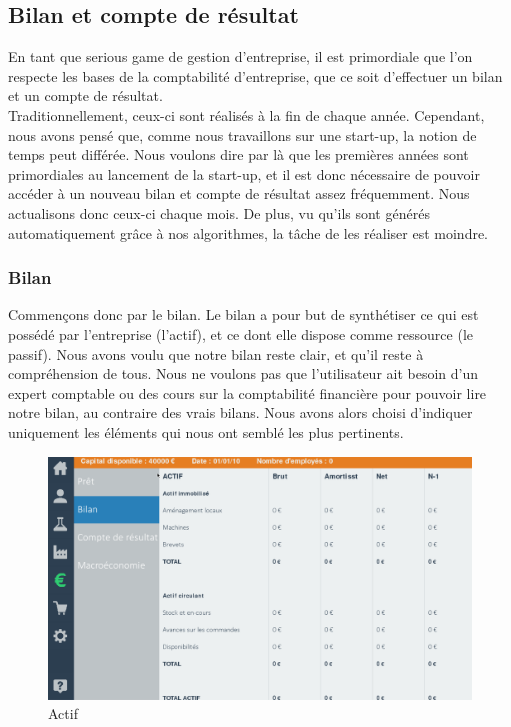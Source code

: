 \subsection{Bilan et compte de résultat}



En tant que serious game de gestion d’entreprise, il est primordiale que l'on respecte les bases de la comptabilité d’entreprise, que ce soit d’effectuer un bilan et un compte de résultat. \\
Traditionnellement, ceux-ci sont réalisés à la fin de chaque année. Cependant, nous avons pensé que, comme nous travaillons sur une start-up, la notion de temps peut différée. Nous voulons dire par là que les premières années sont primordiales au lancement de la start-up, et il est donc nécessaire de pouvoir accéder à un nouveau bilan et compte de résultat assez fréquemment. Nous actualisons donc ceux-ci chaque mois. De plus, vu qu’ils sont générés automatiquement grâce à nos algorithmes, la tâche de les réaliser est moindre.



\subsubsection{Bilan}



Commençons donc par le bilan. Le bilan a pour but de synthétiser ce qui est possédé par l’entreprise (l'actif), et ce dont elle dispose comme ressource (le passif).
Nous avons voulu que notre bilan reste clair, et qu’il reste à compréhension de tous. Nous ne voulons pas que l’utilisateur ait besoin d’un expert comptable ou des cours sur la comptabilité financière pour pouvoir lire notre bilan, au contraire des vrais bilans. Nous avons alors choisi d’indiquer uniquement les éléments qui nous ont semblé les plus pertinents. \\

\begin{figure}[!htb]
\centering
\includegraphics[scale=0.5]{img/actif.png}
\caption{Actif}
\end{figure}

